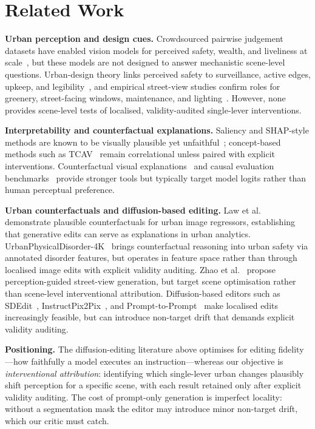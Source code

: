\section{Related Work}

\noindent\textbf{Urban perception and design cues.}
Crowdsourced pairwise judgement datasets have enabled vision models for
perceived safety, wealth, and liveliness at
scale~\cite{salesses2013,naik2014,dubey2016,quintana2025}, but these
models are not designed to answer mechanistic scene-level questions.
Urban-design theory links perceived safety to surveillance, active edges,
upkeep, and legibility~\cite{jacobs1961,newman1972,loewen1993}, and
empirical street-view studies confirm roles for greenery, street-facing
windows, maintenance, and lighting~\cite{li2015greenery,denadai2016lively,jiang2018brokenwindows,portnov2020lighting}. However, none provides scene-level tests of localised, validity-audited
single-lever interventions.

\noindent\textbf{Interpretability and counterfactual explanations.}
Saliency and SHAP-style methods are known to be visually plausible yet
unfaithful~\cite{adebayo2018}; concept-based methods such as
TCAV~\cite{kim2018} remain correlational unless paired with explicit
interventions. Counterfactual visual explanations~\cite{goyal2019} and
causal evaluation benchmarks~\cite{melistas2024} provide stronger tools
but typically target model logits rather than human perceptual preference.

\noindent\textbf{Urban counterfactuals and diffusion-based editing.}
Law et al.~\cite{law2023} demonstrate plausible counterfactuals for
urban image regressors, establishing that generative edits can serve as
explanations in urban analytics. UrbanPhysicalDisorder-4K~\cite{vera2025} brings counterfactual reasoning
into urban safety via annotated disorder features, but operates in
feature space rather than through localised image edits with explicit
validity auditing. Zhao et al.~\cite{zhao2026} propose
perception-guided street-view generation, but target scene optimisation
rather than scene-level interventional attribution.
Diffusion-based editors such as SDEdit~\cite{meng2022},
InstructPix2Pix~\cite{brooks2023}, and
Prompt-to-Prompt~\cite{hertz2023prompt} make localised edits
increasingly feasible, but can introduce non-target drift that demands
explicit validity auditing.

\noindent\textbf{Positioning.}
The diffusion-editing literature above optimises for editing
fidelity---how faithfully a model executes an instruction---whereas our
objective is \emph{interventional attribution}: identifying which
single-lever urban changes plausibly shift perception for a specific
scene, with each result retained only after explicit validity
auditing. The cost of prompt-only generation is imperfect locality:
without a segmentation mask the editor may introduce minor non-target
drift, which our critic must catch.
